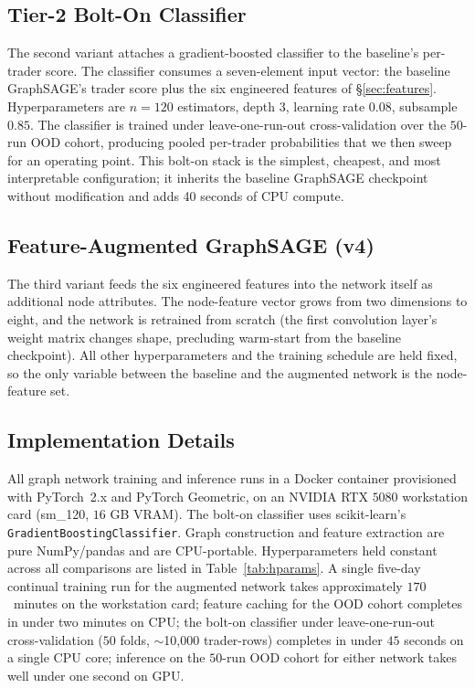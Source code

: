 \documentclass[10pt,twocolumn,letterpaper]{article}
\begin{document}
\subsection{Tier-2 Bolt-On Classifier}
The second variant attaches a gradient-boosted classifier to the
baseline's per-trader score. The classifier consumes a seven-element
input vector: the baseline GraphSAGE's trader score plus the six
engineered features of \S\ref{sec:features}. Hyperparameters are
\(n=120\) estimators, depth \(3\), learning rate \(0.08\), subsample
\(0.85\). The classifier is trained under leave-one-run-out
cross-validation over the \(50\)-run OOD cohort, producing pooled
per-trader probabilities that we then sweep for an operating point.
This bolt-on stack is the simplest, cheapest, and most interpretable
configuration; it inherits the baseline GraphSAGE checkpoint without
modification and adds 40 seconds of CPU compute.

\subsection{Feature-Augmented GraphSAGE (v4)}
The third variant feeds the six engineered features into the network
itself as additional node attributes. The node-feature vector grows
from two dimensions to eight, and the network is retrained from
scratch (the first convolution layer's weight matrix changes shape,
precluding warm-start from the baseline checkpoint). All other
hyperparameters and the training schedule are held fixed, so the
only variable between the baseline and the augmented network is the
node-feature set.


\subsection{Implementation Details}
\label{sec:impl}
All graph network training and inference runs in a Docker container
provisioned with PyTorch~2.x and PyTorch Geometric, on an NVIDIA RTX
\(5080\) workstation card (sm\_120, \(16\) GB VRAM). The bolt-on
classifier uses scikit-learn's \texttt{GradientBoostingClassifier}.
Graph construction and feature extraction are pure NumPy/pandas and
are CPU-portable. Hyperparameters held constant across all comparisons
are listed in Table~\ref{tab:hparams}. A single five-day continual
training run for the augmented network takes approximately
\(170\)~minutes on the workstation card; feature caching for the OOD
cohort completes in under two minutes on CPU; the bolt-on classifier
under leave-one-run-out cross-validation (\(50\) folds, $\sim$10{,}000
trader-rows) completes in under \(45\) seconds on a single CPU core;
inference on the \(50\)-run OOD cohort for either network takes well
under one second on GPU.
\end{document}
